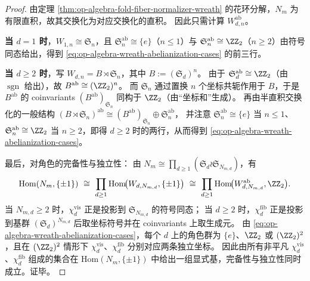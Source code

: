 \begin{proof}
由定理 \ref{thm:op-algebra-fold-fiber-normalizer-wreath} 的花环分解，\(N_m\) 为有限直积，故其交换化为对应交换化的直积。
因此只需计算 \(W_{d,n}^{\mathrm{ab}}\)。
\par
\textbf{当 \(d=1\) 时}，\(W_{1,n}\cong \mathfrak S_n\)，且 \(\mathfrak S_n^{\mathrm{ab}}\cong\{e\}\)（\(n\le 1\)）与 \(\mathfrak S_n^{\mathrm{ab}}\cong \ZZ_2\)（\(n\ge 2\)）由符号同态给出，得到 \eqref{eq:op-algebra-wreath-abelianization-cases} 的前三行。
\par
\textbf{当 \(d\ge 2\) 时}，写 \(W_{d,n}=B\rtimes \mathfrak S_n\)，其中 \(B:=(\mathfrak S_d)^n\)。
由于 \(\mathfrak S_d^{\mathrm{ab}}\cong \ZZ_2\)（由 \(\operatorname{sgn}\) 给出），故 \(B^{\mathrm{ab}}\cong (\ZZ_2)^n\)。
而 \(\mathfrak S_n\) 通过置换 \(n\) 个坐标共轭作用于 \(B\)，于是 \(B^{\mathrm{ab}}\) 的 coinvariants
\(
(B^{\mathrm{ab}})_{\mathfrak S_n}
\)
同构于 \(\ZZ_2\)（由“坐标和”生成）。
再由半直积交换化的一般结构
\(
(B\rtimes \mathfrak S_n)^{\mathrm{ab}}\cong (B^{\mathrm{ab}})_{\mathfrak S_n}\oplus \mathfrak S_n^{\mathrm{ab}}
\)，
并注意 \(\mathfrak S_n^{\mathrm{ab}}\cong\{e\}\) 当 \(n\le 1\)、\(\mathfrak S_n^{\mathrm{ab}}\cong\ZZ_2\) 当 \(n\ge 2\)，即得 \(d\ge 2\) 时的两行，从而得到 \eqref{eq:op-algebra-wreath-abelianization-cases}。
\par
最后，对角色的完备性与独立性：
由 \(N_m\cong\prod_{d\ge 1}(\mathfrak S_d\wr \mathfrak S_{N_{m,d}})\)，有
\[
\mathrm{Hom}(N_m,\{\pm1\})
\ \cong\
\prod_{d\ge 1}\mathrm{Hom}\!\bigl(W_{d,N_{m,d}},\{\pm1\}\bigr)
\ \cong\
\prod_{d\ge 1}\mathrm{Hom}\!\bigl(W_{d,N_{m,d}}^{\mathrm{ab}},\ZZ_2\bigr).
\]
当 \(N_{m,d}\ge 2\) 时，\(\chi_d^{\mathrm{vis}}\) 正是投影到 \(\mathfrak S_{N_{m,d}}\) 的符号同态；
当 \(d\ge 2\) 时，\(\chi_d^{\mathrm{fib}}\) 正是投影到基群 \((\mathfrak S_d)^{N_{m,d}}\) 后取坐标符号并在 coinvariants 上取生成元。
由 \eqref{eq:op-algebra-wreath-abelianization-cases}，每个 \(d\) 上的角色群为 \(\{e\}\)、\(\ZZ_2\) 或 \((\ZZ_2)^2\)，且在 \((\ZZ_2)^2\) 情形下 \(\chi_d^{\mathrm{vis}}\)、\(\chi_d^{\mathrm{fib}}\) 分别对应两条独立坐标。
因此由所有非平凡 \(\chi_d^{\mathrm{vis}}\)、\(\chi_d^{\mathrm{fib}}\) 组成的集合在 \(\mathrm{Hom}(N_m,\{\pm1\})\) 中给出一组显式基，完备性与独立性同时成立。证毕。
\end{proof}

